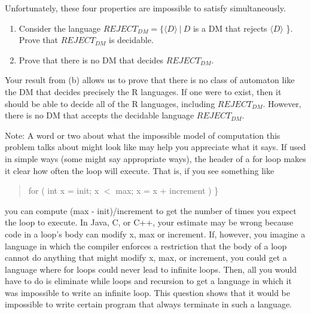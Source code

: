 Unfortunately, these four properties are impossible to satisfy simultaneously.

\begin{enumerate}
\item Consider the language $REJECT_{DM} = \{ \langle D \rangle ~|~ D$ is a DM that rejects $ \langle D \rangle$ \}. Prove that $REJECT_{DM}$ is decidable.

\item Prove that there is no DM that decides $REJECT_{DM}$.
\end{enumerate}

Your result from (b) allows us to prove that there is no class of automaton like the DM that decides precisely the R languages. If one were to exist, then it should be able to decide all of the R languages, including $REJECT_{DM}$. However, there is no DM that accepts the decidable language $REJECT_{DM}$. 

Note: A word or two about what the impossible
model of computation this problem talks about might look like may help you
appreciate what it says.
If used in simple ways (some might say appropriate ways), the header of a for loop
makes it clear how often the loop will execute. That is, if you see something like
\begin{quote}
for ( int x = init; x $<$ max; x = x + increment ) \}
\end{quote}
you can compute (max - init)/increment to get the number of times you expect the loop
to execute. In Java, C, or C++, your estimate may be wrong
because code in a loop's body can
modify x, max or increment. If, however, you imagine a language in which the compiler
enforces a restriction that the body of a loop cannot do anything that might modify
x, max, or increment, you could get a language where for loops could never lead
to infinite loops. Then, all you would have to do is eliminate while loops and recursion
to get a language in which it was impossible to write an infinite loop. This
question shows that it would be impossible to write certain program that always
terminate in such a language.


